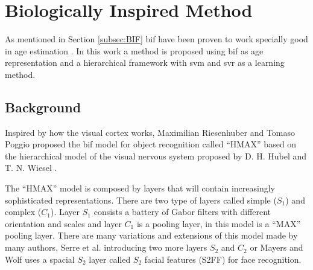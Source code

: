 \section{Biologically Inspired Method}\label{sec:BIF}
As mentioned in Section \ref{subsec:BIF} \acrfull{bif} have been proven to work specially good in age estimation \cite{conf/cvpr/GuoMFH09}\cite{han:age}. In this work a method is proposed using \gls{bif} as age representation and a hierarchical framework with \gls{svm} and \gls{svr} as a learning method.
 
\subsection{Background}

Inspired by how the visual cortex works, Maximilian Riesenhuber and Tomaso Poggio \cite{Riesenhuber99hierarchicalmodels} proposed the \gls{bif} model for object recognition called ``HMAX'' based on the hierarchical model of the visual nervous system proposed by D. H. Hubel and T. N. Wiesel \cite{Hubel:62}. 

The ``HMAX'' model is composed by layers that will contain increasingly sophisticated representations. There are two type of layers called simple ($S_1$) and complex ($C_1$). Layer $S_1$ consists a battery of Gabor filters with different orientation and scales and layer $C_1$ is a pooling layer, in this model is a ``MAX'' pooling layer. There are many variations and extensions of this model made by many authors, Serre et al. \cite{4069258}\cite{1467551} introducing two more layers $S_2$ and $C_2$ or Mayers and Wolf \cite{Meyers:2008:UBI:1325290.1325298} uses a spacial $S_2$ layer called $S_2$ facial features (S2FF) for face recognition.


